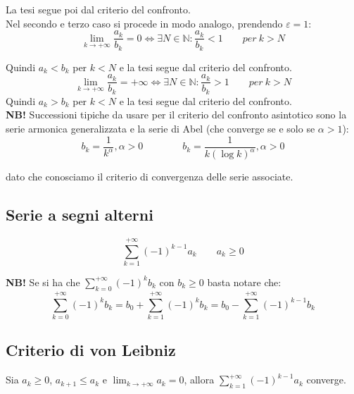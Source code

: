 \documentclass{article}
\begin{document}
\noindent La tesi segue poi dal criterio del confronto.\\
Nel secondo e terzo caso si procede in modo analogo, prendendo $\varepsilon = 1$: 
\begin{equation*}
    \lim_{k \to +\infty} \frac{a_k}{b_k} = 0 \iff \exists N \in \mathbb{N} : \frac{a_k}{b_k} < 1 \qquad per \ k > N
\end{equation*}

\noindent Quindi $a_k < b_k$ per $k < N$ e la tesi segue dal criterio del confronto.
\begin{equation*}
    \lim_{k \to +\infty} \frac{a_k}{b_k} = +\infty \iff \exists N \in \mathbb{N} : \frac{a_k}{b_k} > 1 \qquad per \ k > N
\end{equation*}
\noindent Quindi $a_k > b_k$ per $k < N$ e la tesi segue dal criterio del confronto.\\

\noindent\textbf{NB!} Successioni tipiche da usare per il criterio del confronto asintotico sono la serie armonica generalizzata e la serie di Abel (che converge se e solo se $\alpha > 1$):
\begin{equation*}
    b_k = \frac{1}{k^\alpha}, \alpha > 0 \qquad \qquad b_k = \frac{1}{k(\log k)^\alpha}, \alpha > 0
\end{equation*}

\noindent dato che conosciamo il criterio di convergenza delle serie associate. 

\subsection{Serie a segni alterni}
\begin{equation*}
    \sum_{k = 1}^{+\infty} (-1)^{k - 1}a_k \qquad a_k \geq 0
\end{equation*}

\noindent\textbf{NB!} Se si ha che $\sum_{k = 0}^{+\infty} (-1)^kb_k$ con $b_k \geq 0$ basta notare che:
\begin{equation*}
    \sum_{k = 0}^{+\infty} (-1)^k b_k = b_0 + \sum_{k = 1}^{+\infty} (-1)^k b_k = b_0 - \sum_{k = 1}^{+\infty} (-1)^{k - 1} b_k
\end{equation*}

\subsection{Criterio di von Leibniz}
Sia $a_k \geq 0$, $a_{k + 1} \leq a_k$ e $\lim_{k \to +\infty} a_k = 0$, allora $\sum_{k = 1}^{+\infty} (-1)^{k - 1} a_k$ converge.\\
\end{document}
